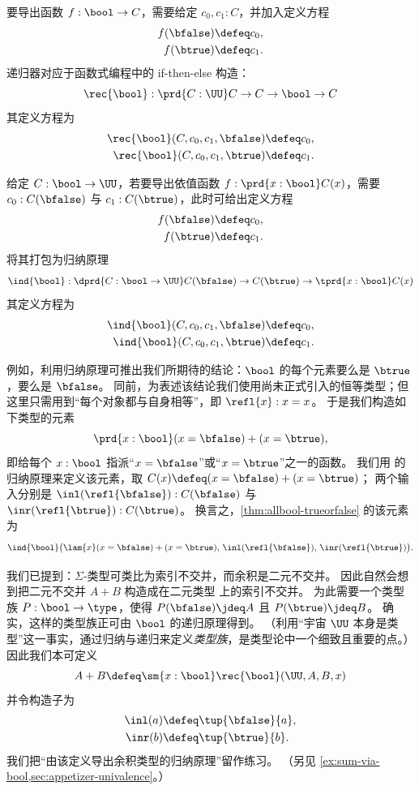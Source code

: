 要导出函数 $f : \bool \to C$，需要给定 $c_0,c_1 : C$，并加入定义方程
\begin{align*}
  f(\bfalse) &\defeq c_0, \\
  f(\btrue)  &\defeq c_1.
\end{align*}
递归器对应于函数式编程中的 if-then-else 构造：
%
\[ \rec{\bool} : \prd{C:\UU}  C \to C \to \bool \to C \]
其定义方程为
\begin{align*}
  \rec{\bool}(C,c_0,c_1,\bfalse) &\defeq c_0, \\
  \rec{\bool}(C,c_0,c_1,\btrue)  &\defeq c_1.
\end{align*}

给定 $C : \bool \to \UU$，若要导出依值函数
$f : \prd{x:\bool}C(x)$，需要 $c_0:C(\bfalse)$ 与 $c_1 : C(\btrue)$，此时可给出定义方程
\begin{align*}
  f(\bfalse) &\defeq c_0, \\
  f(\btrue)  &\defeq c_1.
\end{align*}
将其打包为归纳原理
%
\[ \ind{\bool} : \dprd{C:\bool \to \UU}  C(\bfalse) \to C(\btrue)
\to \tprd{x:\bool} C(x) \]
其定义方程为
\begin{align*}
  \ind{\bool}(C,c_0,c_1,\bfalse) &\defeq c_0, \\
  \ind{\bool}(C,c_0,c_1,\btrue)  &\defeq c_1.
\end{align*}

例如，利用归纳原理可推出我们所期待的结论：$\bool$ 的每个元素要么是 $\btrue$，要么是 $\bfalse$。
同前，为表述该结论我们使用尚未正式引入的恒等类型；但这里只需用到“每个对象都与自身相等”，即 $\refl{x}:x=x$。
于是我们构造如下类型的元素
\begin{equation}\label{thm:allbool-trueorfalse}
  \prd{x:\bool}(x=\bfalse)+(x=\btrue),
\end{equation}
即给每个 $x:\bool$ 指派“$x=\bfalse$”或“$x=\btrue$”之一的函数。
我们用 \bool 的归纳原理来定义该元素，取 $C(x) \defeq (x=\bfalse)+(x=\btrue)$；
两个输入分别是 $\inl(\refl{\bfalse}) : C(\bfalse)$ 与 $\inr(\refl{\btrue}):C(\btrue)$。
换言之，\eqref{thm:allbool-trueorfalse} 的该元素为
\[ \ind{\bool}\big(\lam{x}(x=\bfalse)+(x=\btrue),\, \inl(\refl{\bfalse}),\, \inr(\refl{\btrue})\big). \]

我们已提到：$\Sigma$-类型可类比为索引不交并，而余积是二元不交并。
因此自然会想到把二元不交并 $A+B$ 构造成在二元类型 \bool 上的索引不交并。
为此需要一个类型族 $P:\bool\to\type$，使得 $P(\bfalse)\jdeq A$ 且 $P(\btrue)\jdeq B$。
确实，这样的类型族正可由 $\bool$ 的递归原理得到。
%
（利用“宇宙 $\UU$ 本身是类型”这一事实，通过归纳与递归来定义\emph{类型族}，是类型论中一个细致且重要的点。）
因此我们本可定义
%
\[ A + B \defeq \sm{x:\bool} \rec{\bool}(\UU,A,B,x) \]
并令构造子为
\begin{align*}
  \inl(a) &\defeq \tup{\bfalse}{a}, \\
  \inr(b) &\defeq \tup{\btrue}{b}.
\end{align*}
我们把“由该定义导出余积类型的归纳原理”留作练习。
（另见 \cref{ex:sum-via-bool,sec:appetizer-univalence}。）

